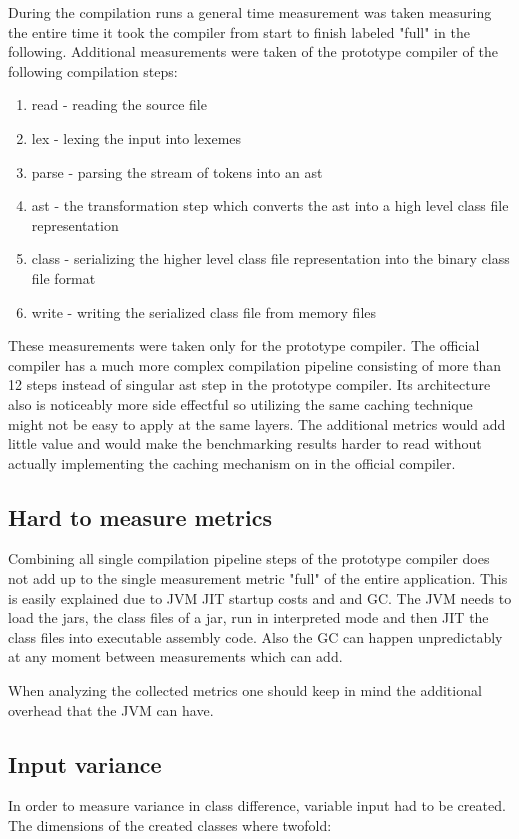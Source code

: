 \documentclass{VUMIFPSbakalaurinis}
\begin{document}
During the compilation runs a general time measurement was taken measuring the entire time it took the compiler from start to finish labeled "full" in the following.
Additional measurements were taken of the prototype compiler of the following compilation steps:

\begin{enumerate}
\item{read - reading the source file}
\item{lex - lexing the input into lexemes}
\item{parse - parsing the stream of tokens into an ast}
\item{ast - the transformation step which converts the ast into a high level class file representation}
\item{class - serializing the higher level class file representation into the binary class file format}
\item{write - writing the serialized class file from memory files}
\end{enumerate}

These measurements were taken only for the prototype compiler.
The official compiler has a much more complex compilation pipeline consisting of more than 12 steps instead of singular ast step in the prototype compiler.
Its architecture also is noticeably more side effectful so utilizing the same caching technique might not be easy to apply at the same layers.
The additional metrics would add little value and would make the benchmarking results harder to read without actually implementing the caching mechanism on in the official compiler.

\subsection{Hard to measure metrics}
Combining all single compilation pipeline steps of the prototype compiler does not add up to the single measurement metric "full" of the entire application.
This is easily explained due to JVM JIT startup costs and and GC.
The JVM needs to load the jars, the class files of a jar, run in interpreted mode and then JIT the class files into executable assembly code.
Also the GC can happen unpredictably at any moment between measurements which can add.

When analyzing the collected metrics one should keep in mind the additional overhead that the JVM can have.

\subsection{Input variance}
In order to measure variance in class difference, variable input had to be created.
The dimensions of the created classes where twofold:
\end{document}
